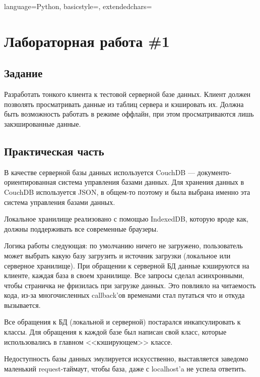 \documentclass[14pt, a4paper]{extreport}
\begin{document}

\lstset
{
        language=Python,
        basicstyle=\footnotesize,%
        extendedchars=\true
}

\section*{Лабораторная работа \#1}
\subsection*{Задание}
Разработать тонкого клиента к тестовой серверной базе данных.
Клиент должен позволять просматривать данные из таблиц сервера и кэшировать их.
Должна быть возможность работать в режиме оффлайн, при этом просматриваются лишь закэшированные данные.

\subsection*{Практическая часть}
В качестве серверной базы данных используется CouchDB --- документо-ориентированная система
управления базами данных. Для хранения данных в CouchDB используется JSON, в общем-то поэтому
и была выбрана именно эта система управления базами данных.

Локальное хранилище реализовано с помощью IndexedDB, которую вроде как, должны поддерживать
все современные браузеры.

Логика работы следующая: по умолчанию ничего не загружено, пользователь может выбрать какую базу загрузить
и источник загрузки (локальное или серверное хранилище).
При обращении к серверной БД данные кэшируются на клиенте, каждая база в своем хранилище.
Все запросы сделал асинхронными, чтобы страничка не фризилась при загрузке данных.
Это повлияло на читаемость кода, из-за многочисленных callback'ов временами стал путаться
что и откуда вызывается.

Все обращения к БД (локальной и серверной) постарался инкапсулировать к классы.
Для обращения к каждой базе был написан свой класс, которые использовались в главном
<<кэширующем>> классе.

Недоступность базы данных эмулируется искусственно, выставляется заведомо маленький request-таймаут,
чтобы база, даже с localhost'a не успела ответить.
\end{document}
